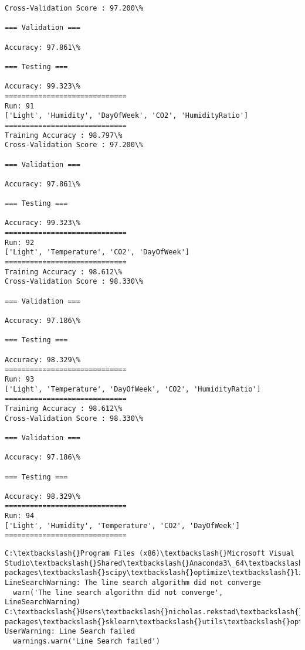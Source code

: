 \documentclass[11pt]{article}
\begin{document}
    \begin{Verbatim}[commandchars=\\\{\}]
Cross-Validation Score : 97.200\%

=== Validation ===

Accuracy: 97.861\%

=== Testing ===

Accuracy: 99.323\%
=============================
Run: 91
['Light', 'Humidity', 'DayOfWeek', 'CO2', 'HumidityRatio']
=============================
Training Accuracy : 98.797\%
Cross-Validation Score : 97.200\%

=== Validation ===

Accuracy: 97.861\%

=== Testing ===

Accuracy: 99.323\%
=============================
Run: 92
['Light', 'Temperature', 'CO2', 'DayOfWeek']
=============================
Training Accuracy : 98.612\%
Cross-Validation Score : 98.330\%

=== Validation ===

Accuracy: 97.186\%

=== Testing ===

Accuracy: 98.329\%
=============================
Run: 93
['Light', 'Temperature', 'DayOfWeek', 'CO2', 'HumidityRatio']
=============================
Training Accuracy : 98.612\%
Cross-Validation Score : 98.330\%

=== Validation ===

Accuracy: 97.186\%

=== Testing ===

Accuracy: 98.329\%
=============================
Run: 94
['Light', 'Humidity', 'Temperature', 'CO2', 'DayOfWeek']
=============================

    \end{Verbatim}

    \begin{Verbatim}[commandchars=\\\{\}]
C:\textbackslash{}Program Files (x86)\textbackslash{}Microsoft Visual Studio\textbackslash{}Shared\textbackslash{}Anaconda3\_64\textbackslash{}lib\textbackslash{}site-packages\textbackslash{}scipy\textbackslash{}optimize\textbackslash{}linesearch.py:313: LineSearchWarning: The line search algorithm did not converge
  warn('The line search algorithm did not converge', LineSearchWarning)
C:\textbackslash{}Users\textbackslash{}nicholas.rekstad\textbackslash{}AppData\textbackslash{}Roaming\textbackslash{}Python\textbackslash{}Python36\textbackslash{}site-packages\textbackslash{}sklearn\textbackslash{}utils\textbackslash{}optimize.py:195: UserWarning: Line Search failed
  warnings.warn('Line Search failed')

    \end{Verbatim}
\end{document}
